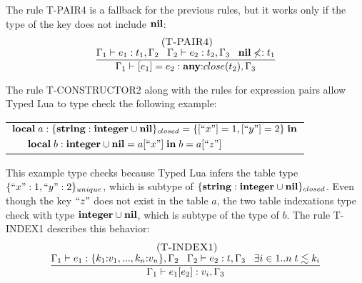 The rule \textsc{T-PAIR4} is a fallback for the previous rules,
but it works only if the type of the key does not include $\mathbf{nil}$:
\[
\begin{array}{c}
\; (\textsc{T-PAIR4})\\
\dfrac{\Gamma_{1} \vdash e_{1}:t_{1}, \Gamma_{2} \;\;\;
       \Gamma_{2} \vdash e_{2}:t_{2}, \Gamma_{3} \;\;\;
       \mathbf{nil} \not<: t_{1}}
      {\Gamma_{1} \vdash [e_{1}] = e_{2}: \mathbf{any}{:}close(t_{2}), \Gamma_{3}}
\end{array}
\]

The rule \textsc{T-CONSTRUCTOR2} along with the rules for expression
pairs allow Typed Lua to type check the following example:
\begin{center}
\begin{tabular}{ll}
\multicolumn{2}{l}{$\mathbf{local} \; a:\{\mathbf{string}:\mathbf{integer} \cup \mathbf{nil}\}_{closed} = \{ [``x"] = 1, [``y"] = 2 \} \; \mathbf{in}$}\\
& \multicolumn{1}{l}{$\mathbf{local} \; b:\mathbf{integer} \cup \mathbf{nil} = a[``x"] \; \mathbf{in} \; b = a[``z"]$}
\end{tabular}
\end{center}

This example type checks because Typed Lua infers the table type
$\{``x":1, ``y":2\}_{unique}$, which is subtype of
$\{\mathbf{string}:\mathbf{integer} \cup \mathbf{nil}\}_{closed}$.
Even though the key $``z"$ does not exist in the table $a$,
the two table indexations type check with type $\mathbf{integer} \cup \mathbf{nil}$,
which is subtype of the type of $b$.
The rule \textsc{T-INDEX1} describes this behavior:
\[
\begin{array}{c}
\; (\textsc{T-INDEX1})\\
\dfrac{\Gamma_{1} \vdash e_{1}:\{k_{1}{:}v_{1}, ..., k_{n}{:}v_{n}\}, \Gamma_{2} \;\;\;
       \Gamma_{2} \vdash e_{2}:t, \Gamma_{3} \;\;\;
       \exists i \in 1{..}n \; t \lesssim k_{i}}
      {\Gamma_{1} \vdash e_{1}[e_{2}]:v_{i}, \Gamma_{3}}
\end{array}
\]

